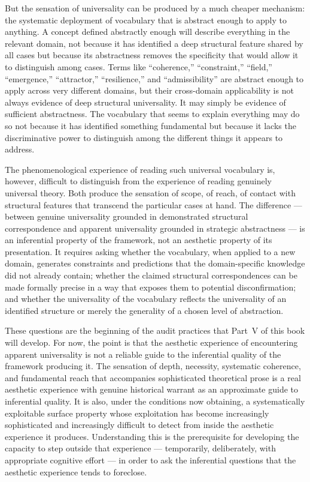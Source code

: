 \documentclass[12pt, openright, twoside]{book}
\begin{document}
But the sensation of universality can be produced by a much cheaper
mechanism: the systematic deployment of vocabulary that is abstract
enough to apply to anything. A concept defined abstractly enough
will describe everything in the relevant domain, not because it has
identified a deep structural feature shared by all cases but because
its abstractness removes the specificity that would allow it to
distinguish among cases. Terms like ``coherence,'' ``constraint,''
``field,'' ``emergence,'' ``attractor,'' ``resilience,'' and
``admissibility'' are abstract enough to apply across very different
domains, but their cross-domain applicability is not always evidence
of deep structural universality. It may simply be evidence of
sufficient abstractness. The vocabulary that seems to explain
everything may do so not because it has identified something
fundamental but because it lacks the discriminative power to
distinguish among the different things it appears to address.

The phenomenological experience of reading such universal vocabulary
is, however, difficult to distinguish from the experience of reading
genuinely universal theory. Both produce the sensation of scope,
of reach, of contact with structural features that transcend the
particular cases at hand. The difference --- between genuine
universality grounded in demonstrated structural correspondence and
apparent universality grounded in strategic abstractness --- is an
inferential property of the framework, not an aesthetic property
of its presentation. It requires asking whether the vocabulary,
when applied to a new domain, generates constraints and predictions
that the domain-specific knowledge did not already contain; whether
the claimed structural correspondences can be made formally precise
in a way that exposes them to potential disconfirmation; and whether
the universality of the vocabulary reflects the universality of an
identified structure or merely the generality of a chosen level of
abstraction.

These questions are the beginning of the audit practices that
Part~V of this book will develop. For now, the point is that the
aesthetic experience of encountering apparent universality is not
a reliable guide to the inferential quality of the framework
producing it. The sensation of depth, necessity, systematic coherence,
and fundamental reach that accompanies sophisticated theoretical
prose is a real aesthetic experience with genuine historical warrant
as an approximate guide to inferential quality. It is also, under
the conditions now obtaining, a systematically exploitable surface
property whose exploitation has become increasingly sophisticated
and increasingly difficult to detect from inside the aesthetic
experience it produces. Understanding this is the prerequisite
for developing the capacity to step outside that experience ---
temporarily, deliberately, with appropriate cognitive effort ---
in order to ask the inferential questions that the aesthetic
experience tends to foreclose.
\end{document}
